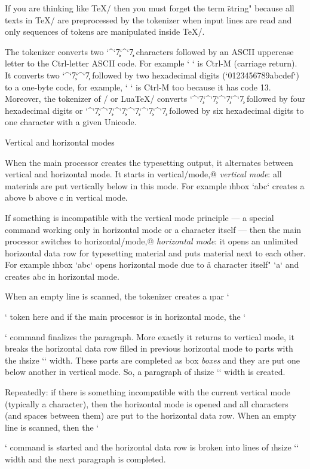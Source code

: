 If you are thinking like \TeX/ then you must forget the term \"string"
because all texts in \TeX/ are preprocessed by the tokenizer when input lines are
read and only sequences of tokens are manipulated inside \TeX/.

The tokenizer converts two `^`\c7`^`\c7 characters followed by an ASCII uppercase
letter to the Ctrl-letter ASCII code. For example `^^M` is Ctrl-M (carriage
return). It converts two `^`\c7`^`\c7 followed by two hexadecimal digits 
(`0123456789abcdef`) to a one-byte code, for example, `^^0d` is Ctrl-M too 
because it has code 13. Moreover, the tokenizer of \XeTeX/ or Lua\TeX/ converts
`^`\c7`^`\c7`^`\c7`^`\c7 followed by four hexadecimal digits or 
`^`\c7`^`\c7`^`\c7`^`\c7`^`\c7`^`\c7 followed by six hexadecimal digits to one
character with a given Unicode.


\sec Vertical and horizontal modes

When the main processor creates the typesetting output, it alternates
between vertical and horizontal mode. It starts in \ii vertical/mode,@ {\em vertical mode}: all
materials are put vertically below in this mode. For example
\i hbox `\hbox{a}\hbox{b}\hbox{c}` creates a above b above c in vertical mode.

If something is incompatible with the vertical mode principle --- a special
command working only in horizontal mode or a character itself ---
then the main processor switches to \ii horizontal/mode,@ {\em horizontal mode}: it opens 
an unlimited horizontal data row for
typesetting material and puts material next to each other. For example
\i hbox `a\hbox{b}\hbox{c}` opens horizontal mode due to \"a character
itself" `a` and creates abc in horizontal mode.

When an empty line is scanned, the tokenizer creates a \i par `\par` token here and
if the main processor is in horizontal mode, the `\par` command finalizes the
paragraph. More exactly it returns to vertical mode, 
it breaks the horizontal data row filled in previous horizontal mode 
to parts with the \i hsize `\hsize` width. These parts are completed as 
\ii box {\em boxes} and they are put one below another in vertical mode. So, a
paragraph of \i hsize `\hsize` width is created.

Repeatedly: if there is something incompatible with the current vertical mode
(typically a character), then the horizontal mode is opened and all characters
(and spaces between them) are put to the horizontal data row. When an empty line
is scanned, then the `\par` command is started and the horizontal 
data row is broken into lines of \i hsize `\hsize` width and the next paragraph 
is completed.

